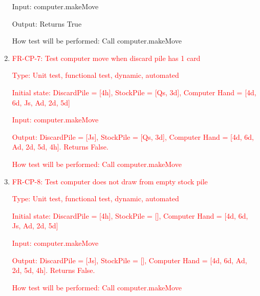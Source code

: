 \documentclass[12pt, titlepage]{article}
\begin{document}
\begin{enumerate}
    Input: computer.makeMove
    
    Output: Returns True
    
    How test will be performed: Call computer.makeMove
    
    \item{\textcolor{red}{FR-CP-7: Test computer move when discard pile has 1 card}}
    
    \textcolor{red}{Type: Unit test, functional test, dynamic, automated}

    \textcolor{red}{Initial state: DiscardPile = [4h], StockPile = [Qs, 3d], Computer Hand = [4d, 6d, Js, Ad, 2d, 5d]}
    
    \textcolor{red}{Input: computer.makeMove}
    
    \textcolor{red}{Output: DiscardPile = [Js], StockPile = [Qs, 3d], Computer Hand = [4d, 6d, Ad, 2d, 5d, 4h]. Returns False.}
    
    \textcolor{red}{How test will be performed: Call computer.makeMove}
   
     \item{\textcolor{red}{FR-CP-8: Test computer does not draw from empty stock pile}}
    
    \textcolor{red}{Type: Unit test, functional test, dynamic, automated}
    
    \textcolor{red}{Initial state: DiscardPile = [4h], StockPile = [], Computer Hand = [4d, 6d, Js, Ad, 2d, 5d]}
    
    \textcolor{red}{Input: computer.makeMove}
    
    \textcolor{red}{Output: DiscardPile = [Js], StockPile = [], Computer Hand = [4d, 6d, Ad, 2d, 5d, 4h]. Returns False.}
    					
    \textcolor{red}{How test will be performed: Call computer.makeMove}
\end{enumerate}
\end{document}
